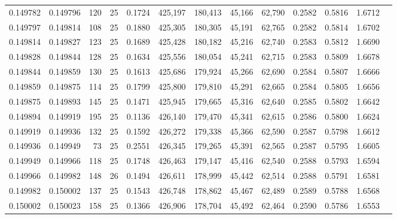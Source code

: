 \begin{tabular}{rrrrrrrrrrrrr}
0.149782 & 0.149796 &   120 &  25 &                                     0.1724 & 425,197 & 180,413 &  45,166 &  62,790 & 0.2582 & 0.5816 & 1.6712 \\
0.149797 & 0.149814 &   108 &  25 &                                     0.1880 & 425,305 & 180,305 &  45,191 &  62,765 & 0.2582 & 0.5814 & 1.6702 \\
0.149814 & 0.149827 &   123 &  25 &                                     0.1689 & 425,428 & 180,182 &  45,216 &  62,740 & 0.2583 & 0.5812 & 1.6690 \\
0.149828 & 0.149844 &   128 &  25 &                                     0.1634 & 425,556 & 180,054 &  45,241 &  62,715 & 0.2583 & 0.5809 & 1.6678 \\
0.149844 & 0.149859 &   130 &  25 &                                     0.1613 & 425,686 & 179,924 &  45,266 &  62,690 & 0.2584 & 0.5807 & 1.6666 \\
0.149859 & 0.149875 &   114 &  25 &                                     0.1799 & 425,800 & 179,810 &  45,291 &  62,665 & 0.2584 & 0.5805 & 1.6656 \\
0.149875 & 0.149893 &   145 &  25 &                                     0.1471 & 425,945 & 179,665 &  45,316 &  62,640 & 0.2585 & 0.5802 & 1.6642 \\
0.149894 & 0.149919 &   195 &  25 &                                     0.1136 & 426,140 & 179,470 &  45,341 &  62,615 & 0.2586 & 0.5800 & 1.6624 \\
0.149919 & 0.149936 &   132 &  25 &                                     0.1592 & 426,272 & 179,338 &  45,366 &  62,590 & 0.2587 & 0.5798 & 1.6612 \\
0.149936 & 0.149949 &    73 &  25 &                                     0.2551 & 426,345 & 179,265 &  45,391 &  62,565 & 0.2587 & 0.5795 & 1.6605 \\
0.149949 & 0.149966 &   118 &  25 &                                     0.1748 & 426,463 & 179,147 &  45,416 &  62,540 & 0.2588 & 0.5793 & 1.6594 \\
0.149966 & 0.149982 &   148 &  26 &                                     0.1494 & 426,611 & 178,999 &  45,442 &  62,514 & 0.2588 & 0.5791 & 1.6581 \\
0.149982 & 0.150002 &   137 &  25 &                                     0.1543 & 426,748 & 178,862 &  45,467 &  62,489 & 0.2589 & 0.5788 & 1.6568 \\
0.150002 & 0.150023 &   158 &  25 &                                     0.1366 & 426,906 & 178,704 &  45,492 &  62,464 & 0.2590 & 0.5786 & 1.6553 \\

\end{tabular}
